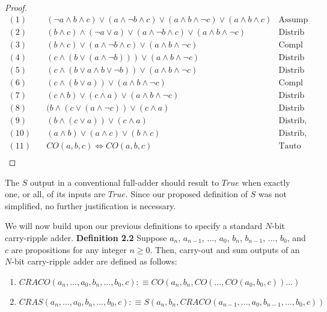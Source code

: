 \documentclass{article}
\begin{document}
\begin{proof}
	\begin{align*}
		(1) &  \quad (\lnot a \land b \land c) \lor (a \land \lnot b \land c) \lor (a \land b \land \lnot c) \lor (a \land b \land c) & \text{Assump} \\
		(2) & \quad (b \land c) \land (\lnot a \lor a) \lor (a \land \lnot b \land c) \lor (a \land b \land \lnot c) & \text{Distrib} \\
		(3) & \quad (b \land c) \lor (a \land \lnot b \land c) \lor (a \land b \land \lnot c) & \text{Compl} \\
		(4) & \quad (c \land (b \lor (a \land \lnot b)))  \lor (a \land b \land \lnot c) & \text{Distrib} \\
		(5) & \quad (c \land (b \lor a \land b \lor \lnot b))  \lor (a \land b \land \lnot c) & \text{Distrib} \\
		(6) & \quad (c \land (b \lor a))  \lor (a \land b \land \lnot c) & \text{Compl} \\
		(7) & \quad (c \land b) \lor (c \land a) \lor (a \land b \land \lnot c) & \text{Distrib} \\
		(8) & \quad (b \land (c \lor (a \land \lnot c)) \lor (c \land a)  & \text{Distrib} \\
		(9) & \quad (b \land (c \lor a)) \lor (c \land a)  & \text{Distrib, Compl} \\
		(10) & \quad  (a \land b) \lor (a \land c) \lor (b \land c) & \text{Distrib, Commut} \\
		(11) & \quad  CO(a, b, c) \iff CO(a, b, c) & \text{Tauto} \\
	\end{align*}
\end{proof}

The $S$ output in a conventional full-adder should result to $True$ when exactly one, or all, of its inputs are $True$. Since our proposed definition of $S$ was not simplified, no further justification is necessary.

We will now build upon our previous definitions to specify a standard $N$-bit carry-ripple adder.
\newpage
\noindent \textbf{Definition 2.2} Suppose $a_n$, $a_{n-1}$, $...$, $a_0$, $b_n$, $b_{n-1}$, $...$, $b_0$, and $c$ are propositions for any integer $ n \geq 0$. Then, carry-out and sum outputs of an $N$-bit carry-ripple adder are defined as follows: 
\begin{enumerate}
	\item $ CRACO(a_n, ..., a_0, b_n, ..., b_0, c) :\equiv CO(a_n, b_n, CO(..., CO(a_0, b_0, c))...)$
	\item $ CRAS(a_n, ..., a_0, b_n, ..., b_0, c) :\equiv S(a_n, b_n, CRACO(a_{n-1}, ..., a_0, b_{n-1}, ..., b_0, c)) $
\end{enumerate}
\end{document}
